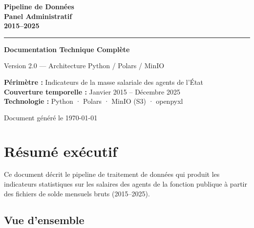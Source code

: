 \documentclass[12pt,a4paper,french]{report}
\begin{document}
\begin{titlepage}
  \centering
  \vspace*{2cm}
  {\huge\bfseries\color{primaryblue}
    Pipeline de Données\\[0.4em]
    Panel Administratif\\[0.4em]
    2015--2025
  \par}
  \vspace{1.5cm}
  \textcolor{accentblue}{\rule{10cm}{2pt}}
  \vspace{1cm}

  {\Large\bfseries Documentation Technique Complète\par}
  \vspace{0.5cm}
  {\large Version 2.0 — Architecture Python / Polars / MinIO\par}
  \vspace{2cm}

  \begin{tcolorbox}[colback=lightblue!40, colframe=primaryblue, width=12cm]
    \centering
    \textbf{Périmètre :} Indicateurs de la masse salariale des agents de l'État\\[4pt]
    \textbf{Couverture temporelle :} Janvier 2015 -- Décembre 2025\\[4pt]
    \textbf{Technologie :} Python · Polars · MinIO (S3) · openpyxl
  \end{tcolorbox}

  \vfill
  {\small\color{darkgray} Document généré le \today\par}
\end{titlepage}

\tableofcontents
\newpage

\chapter{Résumé exécutif}

Ce document décrit le pipeline de traitement de données qui produit les
indicateurs statistiques sur les salaires des agents de la fonction publique
à partir des fichiers de solde mensuels bruts (2015--2025).

\section{Vue d'ensemble}
\end{document}
